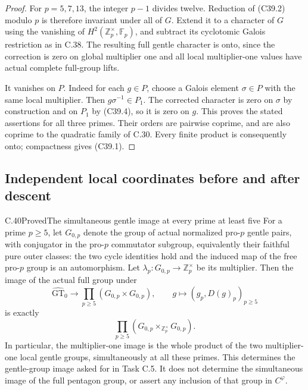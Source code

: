 \begin{proof}
For \(p=5,7,13\), the integer \(p-1\) divides twelve.
Reduction of (C39.2) modulo \(p\) is therefore invariant
under all of \(G\).
Extend it to a character of \(G\) using the vanishing
of \(H^2(\mathbb Z_p^\times,\mathbb F_p)\), and subtract
its cyclotomic Galois restriction as in C.38.
The resulting full gentle character is onto, since
the correction is zero on global multiplier one
and all local multiplier-one values have actual
complete full-group lifts.

It vanishes on \(P\).
Indeed for each \(g\in P\), choose a Galois element
\(\sigma\in P\) with the same local multiplier.
Then \(g\sigma^{-1}\in P_1\).
The corrected character is zero on \(\sigma\)
by construction and on \(P_1\) by (C39.4), so it
is zero on \(g\).
This proves the stated assertions for all three primes.
Their orders are pairwise coprime, and are also coprime
to the quadratic family of C.30.
Every finite product is consequently onto; compactness
gives (C39.1).
\end{proof}


\subsection{Independent local coordinates before and after descent}

\begin{statement}{C.40}{Proved}{The simultaneous gentle image at every prime at least five}
For a prime $p\geq5$, let $G_{0,p}$ denote the group of actual
normalized pro-$p$ gentle pairs, with conjugator in the pro-$p$
commutator subgroup, equivalently their faithful pure outer classes:
the two cycle identities hold and the induced
map of the free pro-$p$ group is an automorphism. Let
$\lambda_p:G_{0,p}\to\mathbb Z_p^\times$ be its multiplier.
Then the image of the actual full group under
\[
 \widehat{\mathrm{GT}}_0\longrightarrow
 \prod_{p\geq5}(G_{0,p}\times G_{0,p}),\qquad
 g\longmapsto (g_p,D(g)_p)_{p\geq5}
                                                        \tag{C.40.1}
\]
is exactly
\[
 \prod_{p\geq5}
       (G_{0,p}\mathbin\times_{\mathbb Z_p^\times}G_{0,p}).
                                                        \tag{C.40.2}
\]
In particular, the multiplier-one image is the whole product
of the two multiplier-one local gentle groups, simultaneously
at all these primes. This determines the gentle-group image
asked for in Task C.5. It does not determine the simultaneous
image of the full pentagon group, or assert any inclusion of
that group in $C^\varphi$.
\end{statement}

